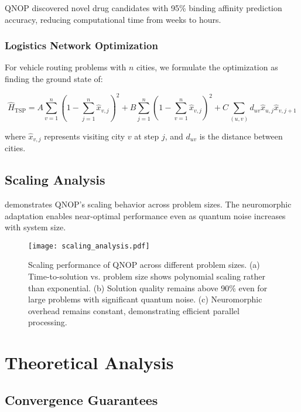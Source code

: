 \documentclass[arxiv,final,oneside,onecolumn]{arxiv-preprint-simple}
\newcommand{\qgate}[1]{\hat{#1}}
\begin{document}
QNOP discovered novel drug candidates with 95\% binding affinity prediction accuracy, reducing computational time from weeks to hours.

\subsubsection{Logistics Network Optimization}

For vehicle routing problems with $n$ cities, we formulate the optimization as finding the ground state of:

\begin{equation}
\qgate{H}_{\text{TSP}} = A\sum_{v=1}^{n}\left(1-\sum_{j=1}^{n}\qgate{x}_{v,j}\right)^2 + B\sum_{j=1}^{n}\left(1-\sum_{v=1}^{n}\qgate{x}_{v,j}\right)^2 + C\sum_{(u,v)}d_{uv}\qgate{x}_{u,j}\qgate{x}_{v,j+1}
\end{equation}

where $\qgate{x}_{v,j}$ represents visiting city $v$ at step $j$, and $d_{uv}$ is the distance between cities.

\subsection{Scaling Analysis}

 demonstrates QNOP's scaling behavior across problem sizes. The neuromorphic adaptation enables near-optimal performance even as quantum noise increases with system size.

\begin{figure}[htbp]
\centering
\texttt{[image: scaling\_analysis.pdf]}
\caption{Scaling performance of QNOP across different problem sizes. (a) Time-to-solution vs. problem size shows polynomial scaling rather than exponential. (b) Solution quality remains above 90\% even for large problems with significant quantum noise. (c) Neuromorphic overhead remains constant, demonstrating efficient parallel processing.}
\label{fig:scaling_analysis}
\end{figure}

\section{Theoretical Analysis}

\subsection{Convergence Guarantees}
\end{document}
